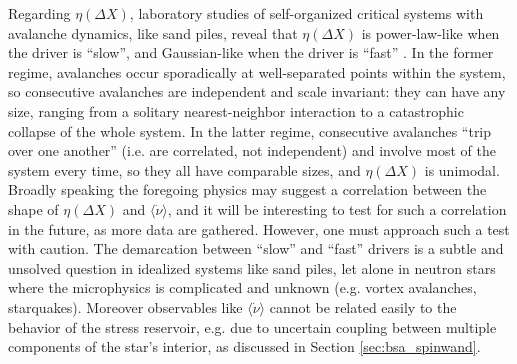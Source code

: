 Regarding $\eta(\Delta X)$, laboratory studies of self-organized critical systems with avalanche dynamics, like sand piles, reveal that $\eta(\Delta X)$ is power-law-like when the driver is ``slow'', and Gaussian-like when the driver is ``fast'' \citep{Jensen1998}. In the former regime, avalanches occur sporadically at well-separated points within the system, so consecutive avalanches are independent and scale invariant: they can have any size, ranging from a solitary nearest-neighbor interaction to a catastrophic collapse of the whole system. In the latter regime, consecutive avalanches ``trip over one another'' (i.e. are correlated, not independent) and involve most of the system every time, so they all have comparable sizes, and $\eta(\Delta X)$ is unimodal. Broadly speaking the foregoing physics may suggest a correlation between the shape of $\eta(\Delta X)$ and $\langle \dot{\nu} \rangle$, and it will be interesting to test for such a correlation in the future, as more data are gathered. However, one must approach such a test with caution. The demarcation between ``slow'' and ``fast'' drivers is a subtle and unsolved question in idealized systems like sand piles, let alone in neutron stars where the microphysics is complicated and unknown (e.g. vortex avalanches, starquakes). Moreover observables like $\langle \dot{\nu} \rangle$ cannot be related easily to the behavior of the stress reservoir, e.g. due to uncertain coupling between multiple components of the star's interior, as discussed in Section \ref{sec:bsa_spinwand}.


